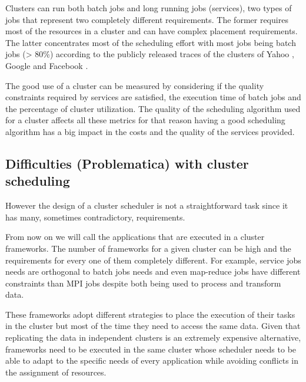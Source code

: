 \documentclass{svjour3}                     %
\begin{document}


Clusters can run both batch jobs and long running jobs (services), two
types of jobs that represent two completely different requirements.
The former requires most of the resources in a cluster and can have
complex placement requirements. The latter concentrates most of the scheduling
effort with most jobs being batch jobs (> 80\%) according to the publicly
released traces of the clusters of Yahoo \cite{parashar_10th_2010}, Google \cite{mishra_towards_2010} and Facebook \cite{Chen:EECS-2012-17}.

The good use of a cluster can be measured by considering if the
quality constraints required by services are satisfied, the execution
time of batch jobs and the percentage of cluster utilization. The
quality of the scheduling algorithm used for a cluster affects all
these metrics for that reason having a good scheduling algorithm has a big
impact in the costs and the quality of the services provided.

\subsection{Difficulties (Problematica) with cluster scheduling}

However the design of a cluster scheduler is not a straightforward
task since it has many, sometimes contradictory, requirements.

From now on we will call the applications that are executed in a
cluster frameworks.  The number of frameworks for a given cluster can
be high and the requirements for every one of them completely
different. For example, service jobs needs are orthogonal to batch
jobs needs and even map-reduce \cite{dean_mapreduce:_2008} jobs have
different constraints than MPI \cite{gabriel04:_open_mpi} jobs despite
both being used to process and transform data.

These frameworks adopt different strategies to place the
execution of their tasks in the cluster but most of the
time they need to access the same data. Given that replicating the
data in independent clusters is an extremely expensive alternative, frameworks
need to be executed in the same cluster whose scheduler needs to be able to adapt
to the specific needs of every application while avoiding conflicts in
the assignment of resources.
\end{document}
